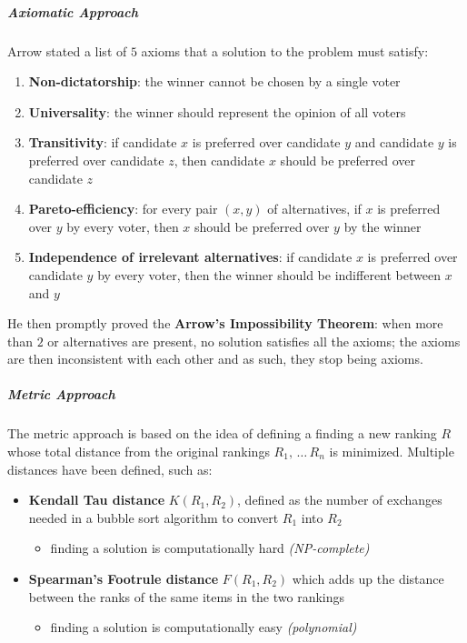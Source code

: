 \documentclass[english]{article}
\begin{document}
\subparagraph*{Axiomatic Approach}
Arrow stated a list of \(5\) axioms that a solution to the problem must satisfy:

\begin{enumerate}[label=axiom \arabic*., leftmargin=*, labelindent=1em, widest*=8]
  \item \textbf{Non-dictatorship}: the winner cannot be chosen by a single voter
  \item \textbf{Universality}: the winner should represent the opinion of all voters
  \item \textbf{Transitivity}: if candidate \(x\) is preferred over candidate \(y\) and candidate \(y\) is preferred over candidate \(z\), then candidate \(x\) should be preferred over candidate \(z\)
  \item \textbf{Pareto-efficiency}: for every pair \(\left( x, y \right)\) of alternatives, if \(x\) is preferred over \(y\) by every voter, then \(x\) should be preferred over \(y\) by the winner
  \item \textbf{Independence of irrelevant alternatives}: if candidate \(x\) is preferred over candidate \(y\) by every voter, then the winner should be indifferent between \(x\) and \(y\)
\end{enumerate}

He then promptly proved the \textbf{Arrow's Impossibility Theorem}: when more than \(2\) or alternatives are present, no solution satisfies all the axioms;
the axioms are then inconsistent with each other and as such, they stop being axioms.

\subparagraph*{Metric Approach}
The metric approach is based on the idea of defining a finding a new ranking \(R\) whose total distance from the original rankings \(R_1, \, \ldots \, R_n\) is minimized.
Multiple distances have been defined, such as:
\begin{itemize}
  \item \textbf{Kendall Tau distance} \(K\left( R_1, R_2 \right)\), defined as the number of exchanges needed in a bubble sort algorithm to convert \(R_1\) into \(R_2\)
        \begin{itemize}[label=\xmarkthin]
          \item finding a solution is computationally hard \textit{(NP-complete)}
        \end{itemize}
  \item \textbf{Spearman's Footrule distance} \(F\left( R_1, R_2 \right)\) which adds up the distance between the ranks of the same items in the two rankings
        \begin{itemize}[label=\cmarkthin]
          \item finding a solution is computationally easy \textit{(polynomial)}
        \end{itemize}
\end{itemize}
\end{document}
